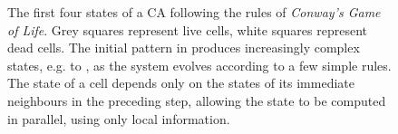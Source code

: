 \begin{figure}
\centering
{}
\caption[Example of state evolution in \emph{Conway's Game of Life}]{\label{fig:ca_life_four_steps}The first four states of a \ac{CA} following the rules of \emph{Conway's Game of Life}. Grey squares represent live cells, white squares represent dead cells. The initial pattern in  produces increasingly complex states, e.g.  to , as the system evolves according to a few simple rules. The state of a cell depends only on the states of its immediate neighbours in the preceding step, allowing the state to be computed in parallel, using only local information.}
\end{figure}


